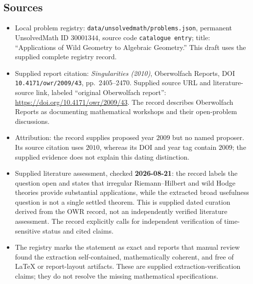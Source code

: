 \documentclass[11pt]{article}
\begin{document}
\subsection{Sources}
\begin{itemize}
\item Local problem registry: \texttt{data/unsolvedmath/problems.json}, permanent UnsolvedMath ID \(30001344\), source code \texttt{catalogue entry}; title: ``Applications of Wild Geometry to Algebraic Geometry.'' This draft uses the supplied complete registry record.
\item Supplied report citation: \emph{Singularities (2010)}, Oberwolfach Reports, DOI \texttt{10.4171/owr/2009/43}, pp.~2405--2470. Supplied source URL and literature-source link, labeled ``original Oberwolfach report'': \url{https://doi.org/10.4171/owr/2009/43}. The record describes Oberwolfach Reports as documenting mathematical workshops and their open-problem discussions.
\item Attribution: the record supplies proposed year \(2009\) but no named proposer. Its source citation uses \(2010\), whereas its DOI and year tag contain \(2009\); the supplied evidence does not explain this dating distinction.
\item Supplied literature assessment, checked \textbf{2026-08-21}: the record labels the question open and states that irregular Riemann--Hilbert and wild Hodge theories provide substantial applications, while the extracted broad usefulness question is not a single settled theorem. This is supplied dated curation derived from the OWR record, not an independently verified literature assessment. The record explicitly calls for independent verification of time-sensitive status and cited claims.
\item The registry marks the statement as exact and reports that manual review found the extraction self-contained, mathematically coherent, and free of LaTeX or report-layout artifacts. These are supplied extraction-verification claims; they do not resolve the missing mathematical specifications.
\end{itemize}
\end{document}
